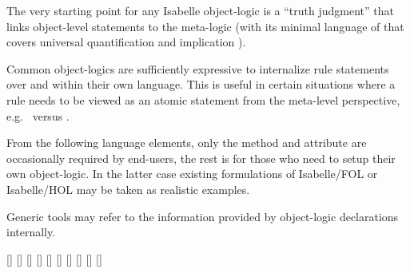 \begin{isabellebody}
\begin{isamarkuptext}
  The very starting point for any Isabelle object-logic is a ``truth
  judgment'' that links object-level statements to the meta-logic
  (with its minimal language of  that covers universal
  quantification  and implication ).

  Common object-logics are sufficiently expressive to internalize rule
  statements over  and  within their own
  language.  This is useful in certain situations where a rule needs
  to be viewed as an atomic statement from the meta-level perspective,
  e.g.\  versus .

  From the following language elements, only the \hyperlink{method.atomize}{\mbox{}}
  method and \hyperlink{attribute.rule-format}{\mbox{}} attribute are occasionally
  required by end-users, the rest is for those who need to setup their
  own object-logic.  In the latter case existing formulations of
  Isabelle/FOL or Isabelle/HOL may be taken as realistic examples.

  Generic tools may refer to the information provided by object-logic
  declarations internally.

  \begin{railoutput}
[]
[]
\rail@end
{}
[]
\rail@bar
{}
[]
[]
[]
\rail@endbar
\rail@end
{}
[]
\rail@bar
{}
[]
[]
[]
\rail@endbar
\rail@end
\end{railoutput}



\end{isamarkuptext}
\end{isabellebody}
